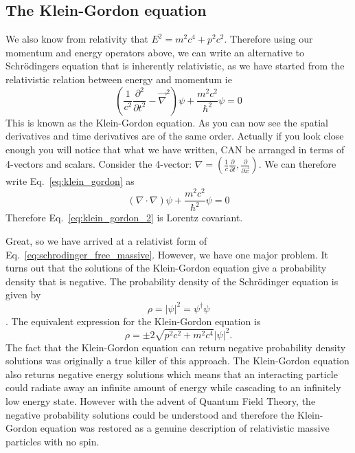 \subsection{The Klein-Gordon equation}
We also know from relativity that $E^2=m^2c^4+p^2c^2$. Therefore using our momentum and energy operators above, we can write an alternative to Schr\"odingers equation that is inherently relativistic, as we have started from the relativistic relation between energy and momentum ie
\begin{equation}
\label{eq:klein_gordon}
(\frac{1}{c^2}\frac{\partial^{2}}{\partial t^2}-\vec{\nabla}^2)\psi+\frac{m^2c^2}{\hbar^2}\psi=0
\end{equation}
This is known as the Klein-Gordon equation. As you can now see the spatial derivatives and time derivatives are of the same order. Actually if you look close enough you will notice that what we have written, CAN be arranged in terms of 4-vectors and scalars. Consider the 4-vector: $\nabla=(\frac{1}{c}\frac{\partial}{\partial t},\frac{\partial}{\partial \vec{x}})$. We can therefore write Eq.~\ref{eq:klein_gordon} as
\begin{equation}
\label{eq:klein_gordon_2}
(\nabla\cdot\nabla)\psi+\frac{m^2c^2}{\hbar^2}\psi=0
\end{equation}
Therefore Eq.~\ref{eq:klein_gordon_2} is Lorentz covariant.

Great, so we have arrived at a relativist form of Eq.~\ref{eq:schrodinger_free_massive}. However, we have one major problem. It turns out that the solutions of the Klein-Gordon equation give a probability density that is negative. The probability density of the Schr\"odinger equation is given by
\[\rho=|\psi|^2=\psi^\dagger\psi\]. 
The equivalent expression for the Klein-Gordon equation is 
\[\rho=\pm 2\sqrt{p^2c^2+m^2c^4}|\psi|^2.\]
The fact that the Klein-Gordon equation can return negative probability density solutions was originally a true killer of this approach. The Klein-Gordon equation also returns negative energy solutions which means that an interacting particle could radiate away an infinite amount of energy while cascading to an infinitely low energy state. However with the advent of Quantum Field Theory, the negative probability solutions could be understood and therefore the Klein-Gordon equation was restored as a genuine description of relativistic massive particles with no spin. 


